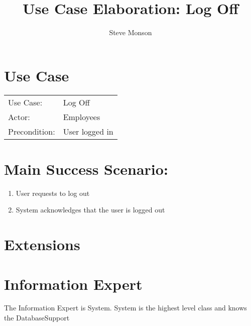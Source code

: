 \documentclass{article}
\title{Use Case Elaboration: Log Off}
\author{ Steve Monson }
\begin{document}
\maketitle


\section*{Use Case}
\begin{tabular}{l l}
Use Case:     & Log Off\\
Actor:        & Employees\\
Precondition: & User logged in\\
\end{tabular}
 

\section*{Main Success Scenario:}

\begin{enumerate}
    \item User requests to log out
    \item System acknowledges that the user is logged out

\end{enumerate}

\section*{Extensions}


\section*{Information Expert}

The Information Expert is System. System is the highest level class and knows the DatabaseSupport
\end{document}
